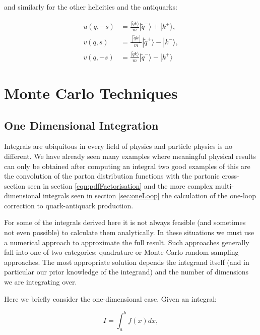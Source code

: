 	and similarly for the other helicities and the antiquarks:

	\begin{subequations}
	\begin{align}
		u(q, -s) &= \frac{\langle \widetilde{q}k\rangle}{m}|\widetilde{q}^-\rangle + |k^+\rangle, \\
		v(q,  s) &= \frac{[\widetilde{q}k]}{m}|\widetilde{q}^+\rangle - |k^-\rangle, \\
		v(q, -s) &= \frac{\langle \widetilde{q}k\rangle}{m}|\widetilde{q}^-\rangle - |k^+\rangle
	\end{align}
	\end{subequations}

\section{Monte Carlo Techniques}
	\label{sec:MC}

	\subsection{One Dimensional Integration}
	\label{sub:MCOneD}

	Integrals are ubiquitous in every field of physics and particle physics is no different.  We have already seen many examples where meaningful physical results
	can only be obtained after computing an integral two good examples of this are the convolution of the parton distribution functions with the partonic
	cross-section seen in section \ref{eqn:pdfFactorisation} and the more complex multi-dimensional integrals seen in section \ref{sec:oneLoop} the calculation
	of the one-loop correction to quark-antiquark production.

	For some of the integrals derived here it is not always feasible (and sometimes not even possible) to calculate them analytically.  In these situations
	we must use a numerical approach to approximate the full result.  Such approaches generally fall into one of two categories; quadrature
	or Monte-Carlo random sampling approaches.  The most appropriate solution depends the integrand itself (and in particular our prior knowledge of
	the integrand) and the number of dimensions we are integrating over.

	Here we briefly consider the one-dimensional case.  Given an integral:

	\begin{equation}
		I = \int_a^b f(x)dx,
		\label{eqn:1DIntegral}
	\end{equation}

